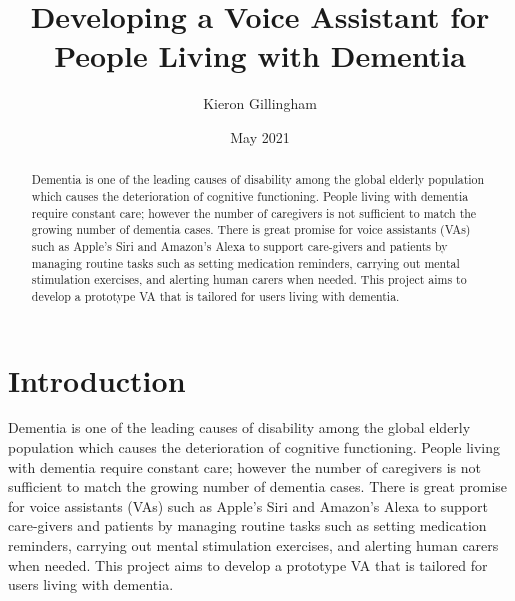 \documentclass[a4paper]{article}
\title{Developing a Voice Assistant for People Living with Dementia}
\author{Kieron Gillingham}
\date{May 2021}
\begin{document}
\maketitle

\begin{abstract}
Dementia is one of the leading causes of disability among the global elderly population which causes the deterioration of cognitive functioning. People living with dementia require constant care; however the number of caregivers is not sufficient to match the growing number of dementia cases. There is great promise for voice assistants (VAs) such as Apple’s Siri and Amazon’s Alexa to support care-givers and patients by managing routine tasks such as setting medication reminders, carrying out mental stimulation exercises, and alerting human carers when needed. This project aims to develop a prototype VA that is tailored for users living with dementia.
\end{abstract}

\section*{Introduction}
Dementia is one of the leading causes of disability among the global elderly population which causes the deterioration of cognitive functioning. People living with dementia require constant care; however the number of caregivers is not sufficient to match the growing number of dementia cases. There is great promise for voice assistants (VAs) such as Apple’s Siri and Amazon’s Alexa to support care-givers and patients by managing routine tasks such as setting medication reminders, carrying out mental stimulation exercises, and alerting human carers when needed. This project aims to develop a prototype VA that is tailored for users living with dementia.

\end{document}
